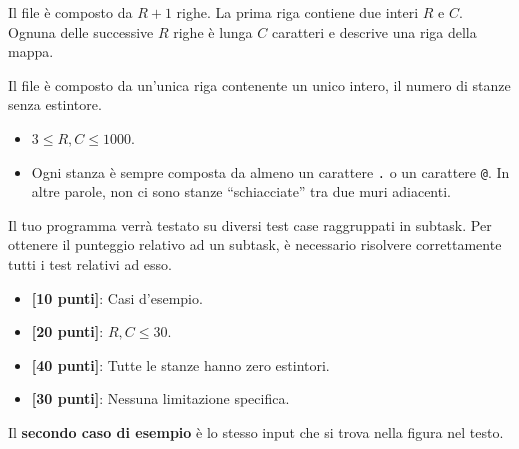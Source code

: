 \InputFile
Il file  è composto da $R+1$ righe. La prima riga contiene due interi $R$ e $C$. Ognuna delle successive $R$ righe è lunga $C$ caratteri e descrive una riga della mappa.

\OutputFile
Il file \outputfile{} è composto da un'unica riga contenente un unico intero, il numero di stanze senza estintore.

\Constraints
\begin{itemize}[nolistsep, itemsep=2mm]
	\item $3 \le R, C \le 1000$.
    \item Ogni stanza è sempre composta da almeno un carattere \texttt{.} o un carattere \texttt{@}. In altre parole, non ci sono stanze ``schiacciate'' tra due muri adiacenti.
\end{itemize}

\Scoring
Il tuo programma verrà testato su diversi test case raggruppati in subtask.
Per ottenere il punteggio relativo ad un subtask, è necessario risolvere
correttamente tutti i test relativi ad esso.

\begin{itemize}[nolistsep,itemsep=2mm]
  \item \textbf{ [10 punti]}: Casi d'esempio.
  \item \textbf{ [20 punti]}: $R, C \le 30$.
  \item \textbf{ [40 punti]}: Tutte le stanze hanno zero estintori.
  \item \textbf{ [30 punti]}: Nessuna limitazione specifica.
\end{itemize}


\Examples
\begin{example}
%
%
\end{example}


\Explanation
Il \textbf{secondo caso di esempio} è lo stesso input che si trova nella figura nel testo.

